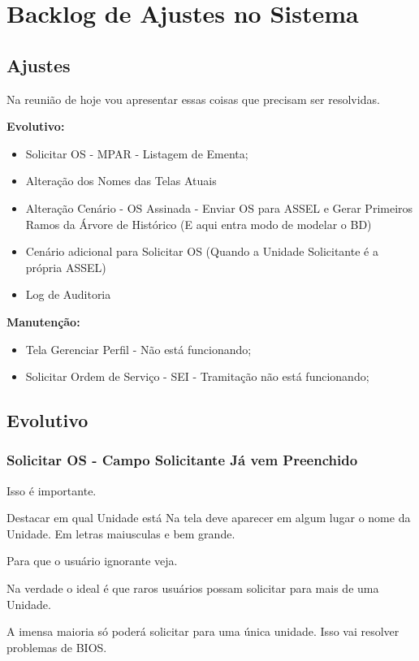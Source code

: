 \chapter{Backlog de Ajustes no Sistema}
\label{detalhes:transicao-e-ajustes}

\section*{Ajustes}

Na reunião de hoje vou apresentar essas coisas que precisam ser resolvidas.

\textbf{Evolutivo:}
\begin{itemize}
	\item Solicitar OS - MPAR - Listagem de Ementa;
	\item Alteração dos Nomes das Telas Atuais
	\item Alteração Cenário - OS Assinada - Enviar OS para ASSEL e Gerar Primeiros Ramos da Árvore de Histórico (E aqui entra modo de modelar o BD)
	\item Cenário adicional para Solicitar OS (Quando a Unidade Solicitante é a própria ASSEL)
	\item Log de Auditoria
\end{itemize}


\textbf{Manutenção:}
\begin{itemize}
	\item Tela Gerenciar Perfil - Não está funcionando;
	\item Solicitar Ordem de Serviço - SEI - Tramitação não está funcionando;
\end{itemize}

\section{Evolutivo}


\subsection{Solicitar OS - Campo Solicitante Já vem Preenchido}

Isso é importante.

\begin{importante}{Destacar em qual Unidade está}
	Na tela deve aparecer em algum lugar o nome da Unidade.
	Em letras maiusculas e bem grande.
	
	Para que o usuário ignorante veja.
	
	Na verdade o ideal é que raros usuários possam solicitar para mais de uma Unidade.
	
	A imensa maioria só poderá solicitar para uma única unidade. Isso vai resolver problemas de BIOS.
	
\end{importante}


